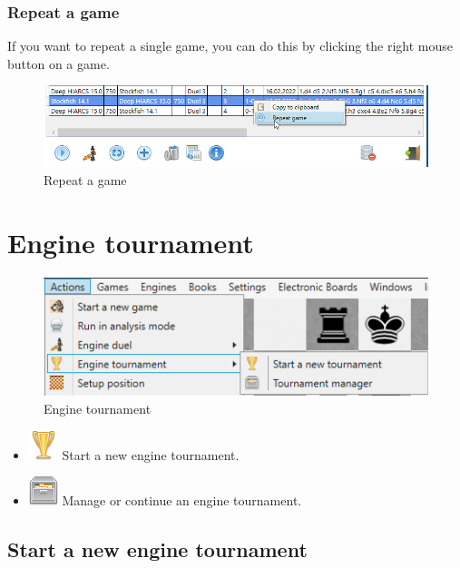 \documentclass[11pt,a4paper]{article}
\begin{document}
\subsubsection{Repeat a game}
If you want to repeat a single game, you can do this by clicking the right mouse button on a game.

\begin{figure}[H]
	\centering
	\includegraphics[scale=0.6]{EngineDuel7.png}
	\caption{Repeat a game}
	\label{fig:EngineDuel7}
\end{figure}

\section{Engine tournament} \label{EngineTournamentl}

\begin{figure}[H]
	\centering
	\includegraphics[scale=1.0]{EngineTournament.png}
	\caption{Engine tournament}
	\label{fig:EngineTournament}
\end{figure}

\begin{itemize}
	\item \includegraphics[scale=0.5]{cup_gold.png} Start a new engine tournament.
	\item \includegraphics[scale=0.5]{file_manager.png} Manage or continue an engine tournament. 
\end{itemize}

\subsection{Start a new engine tournament}
\end{document}
